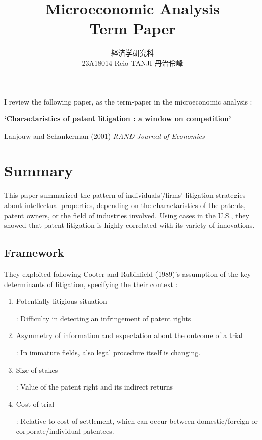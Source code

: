 \documentclass{jsarticle}[12pt]
\begin{document}
\title{Microeconomic Analysis \\
Term Paper}
\author{経済学研究科　 \\ 23A18014 Reio TANJI 丹治伶峰}
\date{}
\maketitle

\large

I review the following paper, as the term-paper in the microeconomic analysis :

\vspace{1zw}

\textbf{`Charactaristics of patent litigation : a window on competition'}

Lanjouw and Schankerman (2001) \textit{RAND Journal of Economics}

 \section{Summary}
 
 This paper summarized the pattern of individuals'/firms' litigation strategies about intellectual properties, depending on the charactaristics of the patents, patent owners, or the field of industries involved. Using cases in the U.S., they showed that patent litigation is highly correlated with its variety of innovations.
 
  \subsection{Framework}
  
  They exploited following Cooter and Rubinfield (1989)'s assumption of the key determinants of litigation, specifying the their context :
  
   \begin{enumerate}
   
   \item Potentially litigious situation
   
   : Difficulty in detecting an infringement of patent rights
   
   \item Asymmetry of information and expectation about the outcome of a trial
   
   : In immature fields, also legal procedure itself is changing.
   
   \item Size of stakes
   
   : Value of the patent right and its indirect returns
   
   \item Cost of trial
   
   : Relative to cost of settlement, which can occur between domestic/foreign or corporate/individual patentees.
   
   \end{enumerate}
  
\end{document}
